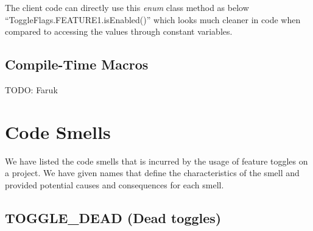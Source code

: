 \documentclass[conference]{IEEEtran}
\begin{document}
The client code can directly use this \textit{enum} class method as below ``ToggleFlags.FEATURE1.isEnabled()'' which looks much cleaner in code when compared to accessing the values through constant variables.

\subsection{Compile-Time Macros}
TODO: Faruk

\section{Code Smells}
\label{discussion}

We have listed the code smells that is incurred by the usage of feature toggles on a project. We have given names that define the characteristics of the smell and provided potential causes and consequences for each smell. 

\subsection{TOGGLE\_DEAD (Dead toggles)}
\end{document}

